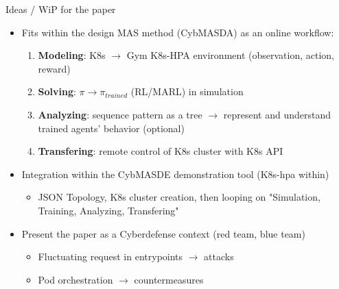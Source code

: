\documentclass{beamer}
\begin{document}
\begin{frame}[allowframebreaks]{Ideas / WiP for the paper}
    \begin{itemize}
        \item Fits within the design MAS method (CybMASDA) as an online workflow:
        \begin{enumerate}
            \item \textbf{Modeling}: K8s $\rightarrow$ Gym K8s-HPA environment (observation, action, reward)
            \item \textbf{Solving}: $\pi \rightarrow \pi_{trained}$ (RL/MARL) in simulation
            \item \textbf{Analyzing}: sequence pattern as a tree $\rightarrow$ represent and understand trained agents' behavior (optional)
            \item \textbf{Transfering}: remote control of K8s cluster with K8s API
        \end{enumerate}
        \item Integration within the CybMASDE demonstration tool (K8s-hpa within)
        \begin{itemize}
            \item JSON Topology, K8s cluster creation, then looping on "Simulation, Training, Analyzing, Transfering"
        \end{itemize}
        \item Present the paper as a Cyberdefense context (red team, blue team)
        \begin{itemize}
            \item Fluctuating request in entrypoints $\rightarrow$ attacks
            \item Pod orchestration $\rightarrow$ countermeasures
        \end{itemize}

        \


\end{itemize}
\end{frame}
\end{document}
